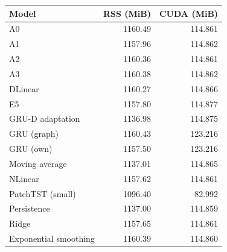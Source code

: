 \begin{tabular}{lrr}
\toprule
Model & RSS (MiB) & CUDA (MiB) \\
\midrule
A0 & 1160.49 & 114.861 \\
A1 & 1157.96 & 114.862 \\
A2 & 1160.36 & 114.861 \\
A3 & 1160.38 & 114.862 \\
DLinear & 1160.27 & 114.866 \\
E5 & 1157.80 & 114.877 \\
GRU-D adaptation & 1136.98 & 114.875 \\
GRU (graph) & 1160.43 & 123.216 \\
GRU (own) & 1157.50 & 123.216 \\
Moving average & 1137.01 & 114.865 \\
NLinear & 1157.62 & 114.861 \\
PatchTST (small) & 1096.40 & 82.992 \\
Persistence & 1137.00 & 114.859 \\
Ridge & 1157.65 & 114.861 \\
Exponential smoothing & 1160.39 & 114.860 \\
\bottomrule
\end{tabular}
